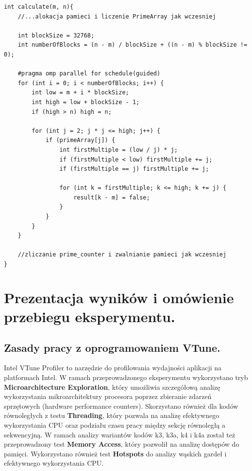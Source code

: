 \documentclass[10pt]{article}
\begin{document}
\begin{lstlisting}[style=mystyle, caption={Kod programu k5.cpp}, label={lst:k5}]
int calculate(m, n){
	//...alokacja pamieci i liczenie PrimeArray jak wczesniej

	int blockSize = 32768; 
	int numberOfBlocks = (n - m) / blockSize + ((n - m) % blockSize != 0);

	#pragma omp parallel for schedule(guided)
	for (int i = 0; i < numberOfBlocks; i++) {
		int low = m + i * blockSize; 
		int high = low + blockSize - 1;
		if (high > n) high = n;

		for (int j = 2; j * j <= high; j++) {
			if (primeArray[j]) {
				int firstMultiple = (low / j) * j;
				if (firstMultiple < low) firstMultiple += j;
				if (firstMultiple == j) firstMultiple += j; 

				for (int k = firstMultiple; k <= high; k += j) {
					result[k - m] = false;
				}
			}
		}
	}

	//zliczanie prime_counter i zwalnianie pamieci jak wczesniej
}
\end{lstlisting}


\newpage
\section{Prezentacja wyników i omówienie przebiegu eksperymentu.}
\subsection*{Zasady pracy z oprogramowaniem VTune.}

Intel VTune Profiler to narzędzie do profilowania wydajności aplikacji na platformach Intel. 
W ramach przeprowadzonego eksperymentu wykorzystano tryb \textbf{Microarchitecture Exploration}, 
który umożliwia szczegółową analizę wykorzystania mikroarchitektury procesora poprzez zbieranie 
zdarzeń sprzętowych (hardware performance counters). Skorzystano również dla kodów 
równoległych z testu \textbf{Threading}, który pozwala na analizę efektywnego wykorzystania CPU oraz
podziału czasu pracy między sekcję równoległą a sekwencyjną.
W ramach analizy wariantów kodów k3, k3a, k4 i k4a został też przeprowadzony test \textbf{Memory Access}, który pozwolił
na analizę dostępów do pamięci. Wykorzystano również test \textbf{Hotspots} do analizy wąskich gardeł 
i efektywnego wykorzystania CPU.
\end{document}
